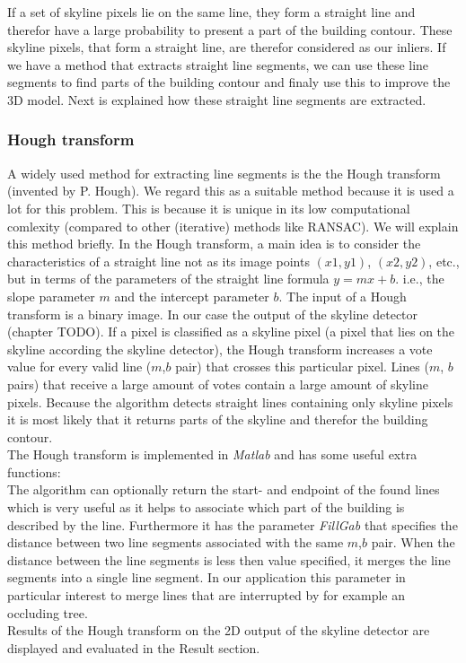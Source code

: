 \documentclass[10pt]{article}
\begin{document}
	If a set of skyline pixels lie on the same line, they form a straight line
	and therefor have a large probability to present a part of the building contour.
	These skyline pixels, that form a straight line, are therefor considered as our
	inliers. 
	If we have a method that extracts straight line segments, we can use these
	line segments to find parts of the building contour and finaly use this to improve the 3D
	model. Next is explained how these straight line segments are extracted.

\subsubsection{Hough transform}
	A widely used method for extracting line segments is the the Hough transform
	(invented by P. Hough).  We regard this as a suitable method because it is
	used a lot for this problem. This is because it is unique in its low
	computational comlexity (compared to other (iterative) methods like RANSAC).
	We will explain this method briefly.
	In the Hough transform, a main idea is to consider the characteristics of a
	straight line not as its image points $(x1, y1)$, $(x2, y2)$, etc., but in
	terms of the parameters of the straight line formula $y = mx + b$. i.e., the
	slope parameter $m$ and the intercept parameter $b$.
	The input of a Hough transform is a binary image. In our case the output of 
	the skyline detector (chapter TODO).
	If a pixel is classified as a skyline pixel (a pixel that lies on the
	skyline according the skyline detector), the Hough transform increases
	a vote value for every valid line ($m$,$b$ pair) that crosses this
	particular pixel.  Lines ($m$, $b$ pairs) that receive a large amount of votes
	contain a large amount of skyline pixels.  
	Because the algorithm detects straight lines containing only skyline pixels it is
	most likely that it returns parts of the skyline and therefor the building contour. \\
	The Hough transform is implemented in \emph{Matlab} and has some useful extra functions:\\
	The algorithm can optionally return the start- and endpoint of the found lines 
	which is very useful as it helps to associate which part of the building is described by the line.
	Furthermore it has the parameter \emph{FillGab} that specifies the distance
	between two line segments associated with the same $m$,$b$ pair. When the
	distance between the line segments is less then value specified, it merges
	the line segments into a single line segment. In our application this
	parameter in particular interest to merge lines that are interrupted by for
	example an occluding tree.\\
	Results of the Hough transform on the 2D output of the skyline detector are
	displayed and evaluated in the Result section.
\end{document}
